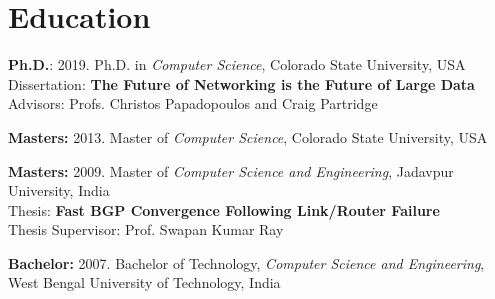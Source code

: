\section{Education}
\begin{cvlist}
\item \textbf{Ph.D.}: 2019.  Ph.D. in \emph{Computer Science}, Colorado State University, USA \\ %
       Dissertation: \textbf{The Future of Networking is the Future of Large Data}\\
     Advisors:  Profs. Christos Papadopoulos and Craig Partridge\\
\item \textbf{Masters:} 2013. Master of \emph{Computer Science}, Colorado State University, USA \\ %
\item \textbf{Masters:} 2009. Master of \emph{Computer Science and Engineering}, Jadavpur University, India\\
    Thesis: \textbf{Fast BGP Convergence Following Link/Router Failure}\\
    Thesis Supervisor: Prof. Swapan Kumar Ray\\
\item \textbf{Bachelor:} 2007. Bachelor of Technology, \textit{Computer Science and Engineering}, West Bengal University of Technology, India
\end{cvlist}
